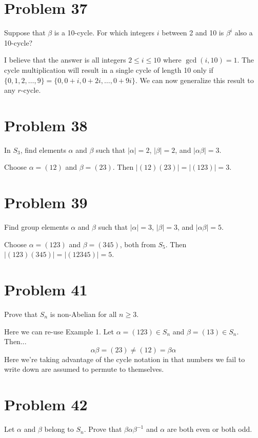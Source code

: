 \documentclass{article}
\begin{document}
\section*{Problem 37}

Suppose that $\beta$ is a 10-cycle.  For which integers $i$ between 2 and 10
is $\beta^i$ also a 10-cycle?

I believe that the answer is all integers $2\leq i\leq 10$ where $\gcd(i,10)=1$.
The cycle multiplication will result in a single cycle of length 10 only if
$\{0,1,2,\dots,9\}=\{0,0+i,0+2i,\dots,0+9i\}$.  We can now generalize this
result to any $r$-cycle.

\section*{Problem 38}

In $S_3$, find elements $\alpha$ and $\beta$ such that $|\alpha|=2$,
$|\beta|=2$, and $|\alpha\beta|=3$.

Choose $\alpha=(12)$ and $\beta=(23)$.  Then $|(12)(23)|=|(123)|=3$.

\section*{Problem 39}

Find group elements $\alpha$ and $\beta$ such that $|\alpha|=3$,
$|\beta|=3$, and $|\alpha\beta|=5$.

Choose $\alpha=(123)$ and $\beta=(345)$, both from $S_5$.
Then $|(123)(345)|=|(12345)|=5$.

\section*{Problem 41}

Prove that $S_n$ is non-Abelian for all $n\geq 3$.

Here we can re-use Example 1.  Let $\alpha=(123)\in S_n$
and $\beta=(13)\in S_n$.  Then...
\begin{equation*}
\alpha\beta = (23) \neq (12) = \beta\alpha
\end{equation*}
Here we're taking advantage of the cycle notation in that
numbers we fail to write down are assumed to permute to themselves.

\section*{Problem 42}

Let $\alpha$ and $\beta$ belong to $S_n$.  Prove that $\beta\alpha\beta^{-1}$ and
$\alpha$ are both even or both odd.
\end{document}
